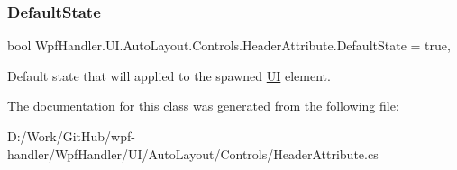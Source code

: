 \subsubsection{\texorpdfstring{Default\+State}{DefaultState}}
{\footnotesize\ttfamily bool Wpf\+Handler.\+U\+I.\+Auto\+Layout.\+Controls.\+Header\+Attribute.\+Default\+State = true\hspace{0.3cm}{\ttfamily [get]}, {\ttfamily [set]}}



Default state that will applied to the spawned \mbox{\hyperlink{namespace_wpf_handler_1_1_u_i}{UI}} element. 



The documentation for this class was generated from the following file\+:\begin{DoxyCompactItemize}
\item 
D\+:/\+Work/\+Git\+Hub/wpf-\/handler/\+Wpf\+Handler/\+U\+I/\+Auto\+Layout/\+Controls/Header\+Attribute.\+cs\end{DoxyCompactItemize}
